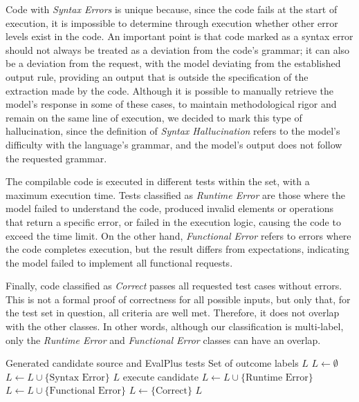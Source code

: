 Code with \emph{Syntax Errors} is unique because, since the code fails at the start of execution, it is impossible to determine through execution whether other error levels exist in the code. An important point is that code marked as a syntax error should not always be treated as a deviation from the code's grammar; it can also be a deviation from the request, with the model deviating from the established output rule, providing an output that is outside the specification of the extraction made by the code. Although it is possible to manually retrieve the model's response in some of these cases, to maintain methodological rigor and remain on the same line of execution, we decided to mark this type of hallucination, since the definition of \emph{Syntax Hallucination} refers to the model's difficulty with the language's grammar, and the model's output does not follow the requested grammar.

The compilable code is executed in different tests within the set, with a maximum execution time. Tests classified as \emph{Runtime Error} are those where the model failed to understand the code, produced invalid elements or operations that return a specific error, or failed in the execution logic, causing the code to exceed the time limit. On the other hand, \emph{Functional Error} refers to errors where the code completes execution, but the result differs from expectations, indicating the model failed to implement all functional requests.

Finally, code classified as \emph{Correct} passes all requested test cases without errors. This is not a formal proof of correctness for all possible inputs, but only that, for the test set in question, all criteria are well met. Therefore, it does not overlap with the other classes. In other words, although our classification is multi-label, only the \emph{Runtime Error} and \emph{Functional Error} classes can have an overlap.


\begin{algorithm}[H]
\caption{Execution-based ground-truth labeling procedure}
\label{alg:ground_truth}
\begin{algorithmic}[1]
\Require Generated candidate source and EvalPlus tests
\Ensure Set of outcome labels $L$
\State $L \gets \emptyset$
    \State $L \gets L \cup \{\text{Syntax Error}\}$
    \State \Return $L$
\EndIf
{}
    \State execute candidate
        \State $L \gets L \cup \{\text{Runtime Error}\}$
        \State $L \gets L \cup \{\text{Functional Error}\}$
    \EndIf
\EndFor
{}
    \State $L \gets \{\text{Correct}\}$
\EndIf
\State \Return $L$
\end{algorithmic}
\end{algorithm}

